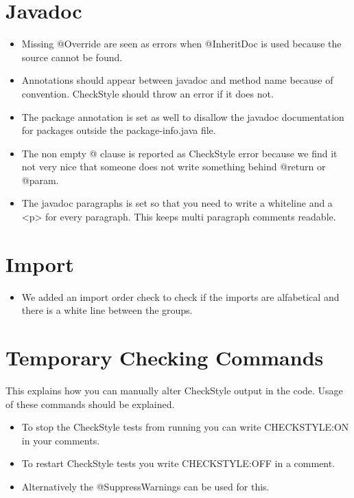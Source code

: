 \documentclass[11pt,a4paper]{report}
\begin{document}
\section{Javadoc}

\begin{itemize}

\item Missing @Override are seen as errors when @InheritDoc is used because the source cannot be found.

\item Annotations should appear between javadoc and method name because of convention. CheckStyle should throw an error if it does not.

\item The package annotation is set as well to disallow the javadoc documentation for packages outside the package-info.java file.

\item The non empty @ clause is reported as CheckStyle error because we find it not very nice that someone does not write something behind @return or @param.

\item The javadoc paragraphs is set so that you need to write a whiteline and a <p> for every paragraph. This keeps multi paragraph comments readable.

\end{itemize}

\section{Import}

\begin{itemize}

\item We added an import order check to check if the imports are alfabetical and there is a white line between the groups.

\end{itemize}

\section{Temporary Checking Commands}

This explains how you can manually alter CheckStyle output in the code. Usage of these commands should be explained.

\begin{itemize}

\item To stop the CheckStyle tests from running you can write CHECKSTYLE:ON in your comments.

\item To restart CheckStyle tests you write CHECKSTYLE:OFF in a comment.

\item Alternatively the @SuppressWarnings can be used for this.

\end{itemize}
\end{document}
